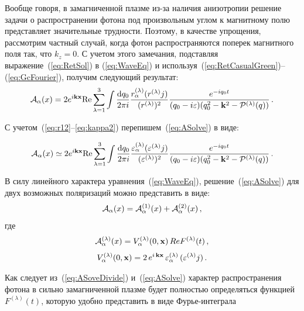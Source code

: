 \documentclass[14pt, russian]{article}
\newcommand{\dd}{\mathrm{d}} %
\begin{document}
Вообще говоря, в замагниченной плазме из-за наличия анизотропии решение задачи о распространении фотона под произвольным углом к магнитному полю представляет значительные трудности. Поэтому, в качестве упрощения, рассмотрим частный случай, когда фотон распространяются поперек магнитного поля так, что $k_z=0$.
С учетом этого замечания, подставляя выражение~(\ref{eq:RetSol}) в (\ref{eq:WaveEq}) и используя~(\ref{eq:RetCasualGreen})--(\ref{eq:GcFourier}), получим следующий результат:
\begin{equation}\label{eq:ASolvePlasma}
	{\cal A}_\alpha(x) = 2 e^{i \mathbf{kx}} \mathrm{Re} \sum_{\lambda=1}^3 \int\frac{\dd q_0}{2\pi i}\frac{r_\alpha^{(\lambda)}(r^{(\lambda)} j)}{(r^{(\lambda)})^2}\frac{e^{-i q_0 t}}{(q_0-i\varepsilon)(q_0^2-\mathbf{k}^2-{\cal P}^{(\lambda)}(q))}\, .
\end{equation}

С учетом~(\ref{eq:r12}--\ref{eq:kappa2}) перепишем~(\ref{eq:ASolve}) в виде:

\begin{equation}\label{eq:ASolve}
	{\cal A}_\alpha(x) \simeq 2 e^{i \mathbf{kx}} \mathrm{Re} \sum_{\lambda=1}^3 \int\frac{\dd q_0}{2\pi i}\frac{\varepsilon_\alpha^{(\lambda)}(\varepsilon^{(\lambda)} j)}{(\varepsilon^{(\lambda)})^2}\frac{e^{-i q_0 t}}{(q_0-i\varepsilon)(q_0^2-\mathbf{k}^2-{\cal P}^{(\lambda)}(q))}\, .
\end{equation}

В силу линейного характера уравнения~(\ref{eq:WaveEq}), решение~(\ref{eq:ASolve}) для двух возможных поляризаций можно представить в виде:
\begin{equation}\label{eq:ASoveDivide}
	{\cal A}_\alpha(x)={\cal A}^{(1)}_\alpha(x)+{\cal A}^{(2)}_\alpha(x)\, ,
\end{equation}
где 
%
\begin{eqnarray}                        		
{\cal A}^{(\lambda)}_{\alpha} (x) = V^{(\lambda)}_\alpha (0, {\bf x}) \, Re F^{(\lambda)} (t) \, ,
\label{eq:V}
\end{eqnarray}
\begin{eqnarray}
V^{(\lambda)}_\alpha (0, {\bf x}) = 2\, e^{ i\, {\bf k x}} \, 
\varepsilon^{(\lambda)}_\alpha \, (\varepsilon^{(\lambda)} j)\, .
\label{eq:partialV}
\end{eqnarray}

Как следует из~(\ref{eq:ASoveDivide}) и~(\ref{eq:ASolve}) характер распространения фотона в сильно замагниченной плазме будет полностью определяться функцией $F^{(\lambda)} (t)$, которую удобно представить в виде Фурье-интеграла
\end{document}
